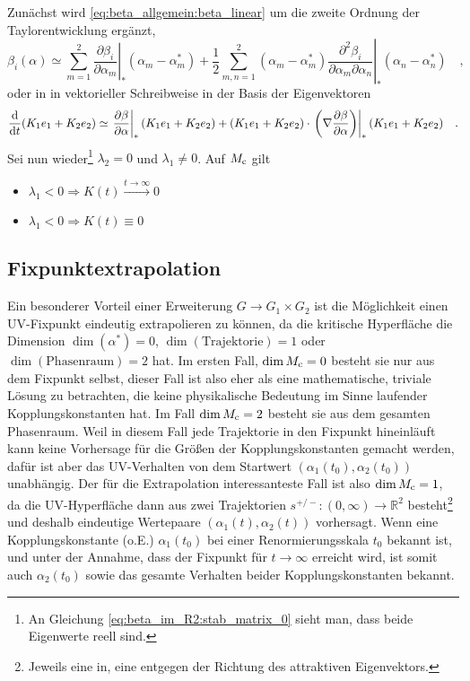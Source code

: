 	Zunächst wird \eqref{eq:beta_allgemein:beta_linear} um die zweite 
	Ordnung der Taylorentwicklung ergänzt,
     \begin{equation}
     \beta_i(\alpha) \simeq \sum\limits_{m=1}^2 \left. \frac{\partial \beta_i
     }{\partial
      \alpha_m}\right|_* \left(\alpha_m-\alpha^*_m\right) + \frac12 
      \sum\limits_{m,n=1}^2 
       \left(\alpha_m-\alpha^*_m\right)
      \left.\frac{\partial^2 \beta_i}{\partial\alpha_m \partial\alpha_n}
      \right|_* \left(\alpha_n-\alpha^*_n\right) \quad ,
     \end{equation}
     oder in in vektorieller Schreibweise in der Basis der Eigenvektoren
     \begin{equation}
     \frac{\text{d}}{\text{d} t} (K_1e_1+K_2e_2)\simeq\left.\frac{\partial \beta}{\partial \alpha}\right|_* (K_1e_1+K_2e_2) +
     (K_1e_1+K_2e_2) \cdot \left.\left(\nabla \frac{\partial \beta}{\partial \alpha} \right)\right|_*
      (K_1e_1+K_2e_2) \quad .
     \end{equation}
     Sei nun wieder\footnote{An Gleichung \eqref{eq:beta_im_R2:stab_matrix_0} 
     sieht man, dass beide Eigenwerte reell sind.} $\lambda_2=0$ und 
     $\lambda_1\neq 0$. Auf $M_\text{c}$ gilt 
     \begin{itemize}
     	\item $\lambda_1<0 \Rightarrow K(t)
     		\overset{t\to \infty}{\longrightarrow} 0$
     	\item $\lambda_1<0 \Rightarrow K(t) \equiv 0$
	\end{itemize}
	
      
  \subsection{Fixpunktextrapolation}
    Ein besonderer Vorteil einer Erweiterung $G \to G_1\times G_2$ ist die 
    Möglichkeit einen UV-Fixpunkt eindeutig extrapolieren zu können, da die 
    kritische Hyperfläche die Dimension $\dim(\alpha^*)=0$, 
    $\dim(\text{Trajektorie})=1$ oder $\dim(\text{Phasenraum})=2$ hat. Im 
    ersten Fall, $\dim M_\text{c}=0$ besteht sie nur aus dem Fixpunkt selbst, 
    dieser Fall ist also eher als eine mathematische, triviale Lösung zu 
    betrachten, die keine physikalische Bedeutung im Sinne laufender 
    Kopplungskonstanten hat. Im Fall $\dim M_\text{c} =2$ besteht sie aus dem gesamten 
    Phasenraum. Weil in diesem Fall jede Trajektorie in den Fixpunkt 
    hineinläuft kann keine Vorhersage für die Größen der Kopplungskonstanten 
    gemacht werden, dafür ist aber das UV-Verhalten von dem Startwert 
    $\left(\alpha_1(t_0),\alpha_2(t_0)\right)$ unabhängig. Der für die 
    Extrapolation interessanteste Fall ist also $\dim M_\text{c} = 1$, da die 
    UV-Hyperfläche dann aus zwei Trajektorien 
    $s^{+/-}:(0,\infty)\to \mathbb{R}^2$ besteht\footnote{Jeweils eine in, eine 
    entgegen der Richtung des attraktiven Eigenvektors.} und deshalb 
    eindeutige Wertepaare $(\alpha_1(t),\alpha_2(t))$ vorhersagt. Wenn eine 
    Kopplungskonstante (o.E.) $\alpha_1(t_0)$ bei einer Renormierungsskala 
    $t_0$ bekannt ist, und unter der Annahme, dass der Fixpunkt für 
    $t\to\infty$ erreicht wird, ist somit auch $\alpha_2(t_0)$ sowie das 
    gesamte Verhalten beider Kopplungskonstanten bekannt.
    
